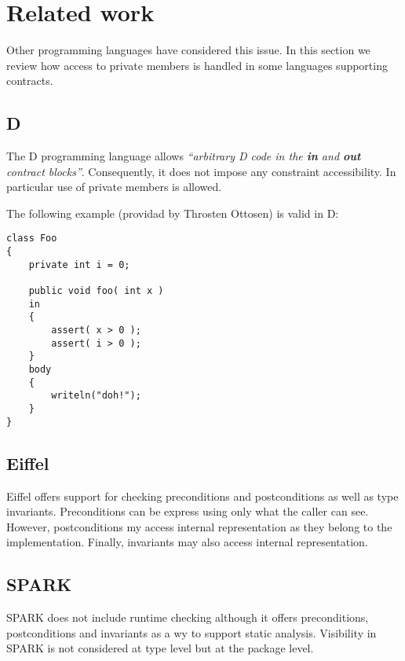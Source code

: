 \section{Related work}

Other programming languages have considered this issue. 
In this section we review how access to private members is handled
in some languages supporting contracts.

\subsection{D}

The D programming language allows \emph{``arbitrary D code in the \textbf{in}
and \textbf{out} contract blocks''}. Consequently, it does not impose any
constraint accessibility. In particular use of private members is allowed.

The following example (providad by Throsten Ottosen) is valid in D:

\begin{lstlisting}[morekeywords={in,body}]
class Foo
{
    private int i = 0;
    
    public void foo( int x ) 
    in
    {
        assert( x > 0 );
        assert( i > 0 );
    }
    body
    {
        writeln("doh!"); 
    }
}
\end{lstlisting}

\subsection{Eiffel}

Eiffel offers support for checking preconditions and postconditions as well as
type invariants. Preconditions can be express using only what the caller can
see. However, postconditions my access internal representation as they belong to
the implementation. Finally, invariants may also access internal representation.

\subsection{SPARK}

SPARK does not include runtime checking although it offers preconditions,
postconditions and invariants as a wy to support static analysis. Visibility in
SPARK is not considered at type level but at the package level.


